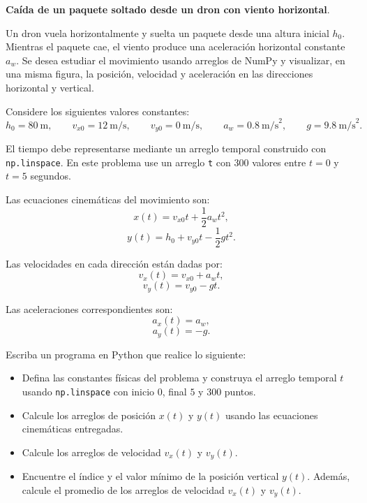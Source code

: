 \providecommand{\Needspace}[1]{}
\Needspace{8\baselineskip}
\item \textbf{Caída de un paquete soltado desde un dron con viento horizontal}.
\nopagebreak[4]

\begin{tcolorbox}[colback=blue!2!white,colframe=blue!55!black,title={Enunciado},breakable]
Un dron vuela horizontalmente y suelta un paquete desde una altura inicial $h_0$. Mientras el paquete cae, el viento produce una aceleración horizontal constante $a_w$. Se desea estudiar el movimiento usando arreglos de NumPy y visualizar, en una misma figura, la posición, velocidad y aceleración en las direcciones horizontal y vertical.

Considere los siguientes valores constantes:
\[
h_0 = 80 \ \text{m},
\qquad
v_{x0} = 12 \ \text{m/s},
\qquad
v_{y0} = 0 \ \text{m/s},
\qquad
a_w = 0.8 \ \text{m/s}^2,
\qquad
g = 9.8 \ \text{m/s}^2.
\]

El tiempo debe representarse mediante un arreglo temporal construido con \texttt{np.linspace}. En este problema use un arreglo \texttt{t} con $300$ valores entre $t=0$ y $t=5$ segundos.

Las ecuaciones cinemáticas del movimiento son:
\[
x(t) = v_{x0}t + \frac{1}{2}a_wt^2,
\]
\[
y(t) = h_0 + v_{y0}t - \frac{1}{2}gt^2.
\]

Las velocidades en cada dirección están dadas por:
\[
v_x(t) = v_{x0} + a_wt,
\]
\[
v_y(t) = v_{y0} - gt.
\]

Las aceleraciones correspondientes son:
\[
a_x(t) = a_w,
\]
\[
a_y(t) = -g.
\]

Escriba un programa en Python que realice lo siguiente:

\begin{itemize}
    \item[(a)] Defina las constantes físicas del problema y construya el arreglo temporal $t$ usando \texttt{np.linspace} con inicio $0$, final $5$ y $300$ puntos.

    \item[(b)] Calcule los arreglos de posición $x(t)$ y $y(t)$ usando las ecuaciones cinemáticas entregadas.

    \item[(c)] Calcule los arreglos de velocidad $v_x(t)$ y $v_y(t)$.

    \item[(d)] Encuentre el índice y el valor mínimo de la posición vertical $y(t)$. Además, calcule el promedio de los arreglos de velocidad $v_x(t)$ y $v_y(t)$.


\end{itemize}
\end{tcolorbox}
